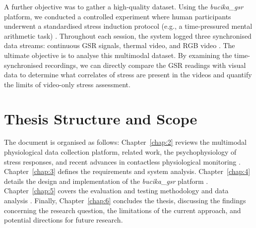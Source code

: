 \documentclass[11pt,a4paper]{report}
\begin{document}
A further objective was to gather a high-quality dataset.
Using the \textit{bucika\_gsr} platform, we conducted a controlled experiment where human participants underwent a standardised stress induction protocol (e.g., a time-pressured mental arithmetic task)
.
Throughout each session, the system logged three synchronised data streams: continuous GSR signals, thermal video, and RGB video
. The ultimate objective is to analyse this multimodal dataset.
By examining the time-synchronised recordings, we can directly compare the GSR readings with visual data to determine what correlates of stress are present in the videos and quantify the limits of video-only stress assessment.

\section{Thesis Structure and Scope}

The document is organised as follows: Chapter~\ref{chap:2} reviews the multimodal physiological data collection platform, related work, the psychophysiology of stress responses, and recent advances in contactless physiological monitoring
. Chapter~\ref{chap:3} defines the requirements and system analysis.
Chapter~\ref{chap:4} details the design and implementation of the \textit{bucika\_gsr} platform
.
Chapter~\ref{chap:5} covers the evaluation and testing methodology and data analysis
.
Finally, Chapter~\ref{chap:6} concludes the thesis, discussing the findings concerning the research question, the limitations of the current approach, and potential directions for future research.



\end{document}
